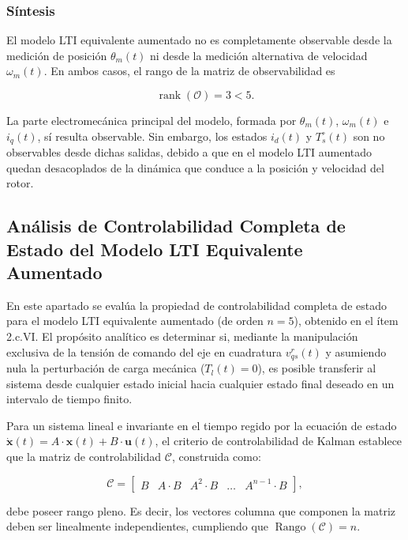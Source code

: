 \documentclass[10pt,a4paper]{article}
\begin{document}
\subsubsection{Síntesis}
El modelo LTI equivalente aumentado no es completamente observable desde la medición de posición $\theta_m(t)$ ni desde la medición alternativa de velocidad $\omega_m(t)$. En ambos casos, el rango de la matriz de observabilidad es

\begin{equation*}
	\operatorname{rank}(\mathcal{O})=3<5.
\end{equation*}

La parte electromecánica principal del modelo, formada por $\theta_m(t)$, $\omega_m(t)$ e $i_q(t)$, sí resulta observable. Sin embargo, los estados $i_d(t)$ y $T_s^\circ(t)$ son no observables desde dichas salidas, debido a que en el modelo LTI aumentado quedan desacoplados de la dinámica que conduce a la posición y velocidad del rotor.

\subsection{Análisis de Controlabilidad Completa de Estado del Modelo LTI Equivalente Aumentado}

En este apartado se evalúa la propiedad de controlabilidad completa de estado para el modelo LTI equivalente aumentado (de orden $n=5$), obtenido en el ítem 2.c.VI. El propósito analítico es determinar si, mediante la manipulación exclusiva de la tensión de comando del eje en cuadratura $v_{qs}^r(t)$ y asumiendo nula la perturbación de carga mecánica ($T_l(t)=0$), es posible transferir al sistema desde cualquier estado inicial hacia cualquier estado final deseado en un intervalo de tiempo finito.

Para un sistema lineal e invariante en el tiempo regido por la ecuación de estado $\dot{\mathbf{x}}(t) = A \cdot \mathbf{x}(t) + B \cdot \mathbf{u}(t)$, el criterio de controlabilidad de Kalman establece que la matriz de controlabilidad $\mathcal{C}$, construida como:

\begin{equation}
    \mathcal{C} = \begin{bmatrix} B & A \cdot B & A^2 \cdot B & \dots & A^{n-1} \cdot B \end{bmatrix},
\end{equation}

debe poseer rango pleno. Es decir, los vectores columna que componen la matriz deben ser linealmente independientes, cumpliendo que $\operatorname{Rango}(\mathcal{C}) = n$.
\end{document}
